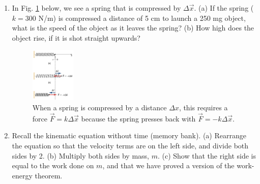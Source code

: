 \documentclass{article}
\begin{document}
\begin{enumerate}
\item In Fig. \ref{fig:work} below, we see a spring that is compressed by $\Delta \vec{x}$.  (a) If the spring ($k = 300$ N/m) is compressed a distance of 5 cm to launch a 250 mg object, what is the speed of the object as it leaves the spring?  (b) How high does the object rise, if it is shot straight upwards? \\ \vspace{2cm}
\begin{figure}
\centering
\includegraphics[width=0.2\textwidth]{springWork.png}
\caption{\label{fig:work} When a spring is compressed by a distance $\Delta x$, this requires a force $\vec{F} = k\Delta \vec{x}$ because the spring presses back with $\vec{F} = -k\Delta \vec{x}$.}
\end{figure}
\item Recall the kinematic equation without time (memory bank). (a) Rearrange the equation so that the velocity terms are on the left side, and divide both sides by 2.  (b) Multiply both sides by mass, $m$.  (c) Show that the right side is equal to the work done on $m$, and that we have proved a version of the work-energy theorem.
\end{enumerate}
\end{document}

